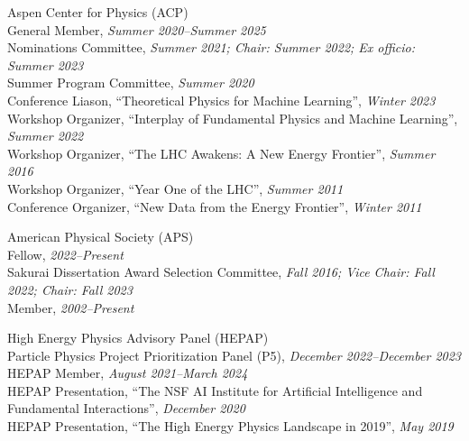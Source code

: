 \item Aspen Center for Physics (ACP)
\\ General Member, \emph{Summer 2020--Summer 2025}
\\ Nominations Committee, \emph{Summer 2021; Chair: Summer 2022; Ex officio: Summer 2023}
\\ Summer Program Committee, \emph{Summer 2020}
\\ Conference Liason, ``Theoretical Physics for Machine Learning'', \emph{Winter 2023}
\\ Workshop Organizer, ``Interplay of Fundamental Physics and Machine Learning'', \emph{Summer 2022}
\\ Workshop Organizer, ``The LHC Awakens: A New Energy Frontier'', \emph{Summer 2016}
\\ Workshop Organizer, ``Year One of the LHC'', \emph{Summer 2011}
\\ Conference Organizer, ``New Data from the Energy Frontier'', \emph{Winter 2011}
\item American Physical Society (APS)
\\ Fellow, \emph{2022--Present}
\\ Sakurai Dissertation Award Selection Committee, \emph{Fall 2016; Vice Chair: Fall 2022; Chair: Fall 2023}
\\ Member, \emph{2002--Present}
\item High Energy Physics Advisory Panel (HEPAP)
\\ Particle Physics Project Prioritization Panel (P5), \emph{December 2022--December 2023}
\\ HEPAP Member, \emph{August 2021--March 2024}
\\ HEPAP Presentation, ``The NSF AI Institute for Artificial Intelligence and Fundamental Interactions'', \emph{December 2020}
\\ HEPAP Presentation, ``The High Energy Physics Landscape in 2019'', \emph{May 2019}

